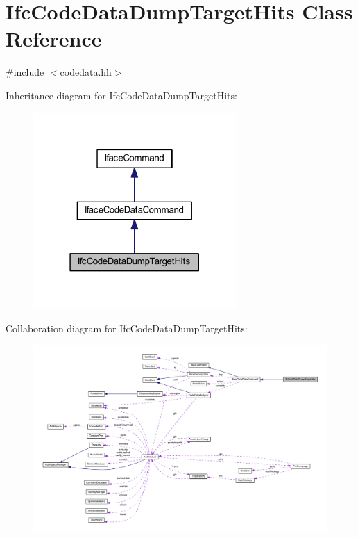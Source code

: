 \hypertarget{class_ifc_code_data_dump_target_hits}{}\section{Ifc\+Code\+Data\+Dump\+Target\+Hits Class Reference}
\label{class_ifc_code_data_dump_target_hits}


{\ttfamily \#include $<$codedata.\+hh$>$}



Inheritance diagram for Ifc\+Code\+Data\+Dump\+Target\+Hits\+:
\nopagebreak
\begin{figure}[H]
\begin{center}
\leavevmode
\includegraphics[width=219pt]{class_ifc_code_data_dump_target_hits__inherit__graph}
\end{center}
\end{figure}


Collaboration diagram for Ifc\+Code\+Data\+Dump\+Target\+Hits\+:
\nopagebreak
\begin{figure}[H]
\begin{center}
\leavevmode
\includegraphics[width=350pt]{class_ifc_code_data_dump_target_hits__coll__graph}
\end{center}
\end{figure}
